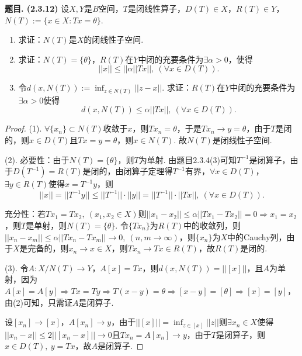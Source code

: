 \documentclass[12pt, a4paper, oneside]{ctexart}
\newcounter{problem}  %
\newenvironment{problem}[1][]{\stepcounter{problem}\par\noindent\textbf{题目\arabic{problem}. #1}}{\smallskip\par}
\let\leq=\leqslant %
\begin{document}
\begin{problem}[(2.3.12)]
    设$X,Y$是$B$空间，$T$是闭线性算子，$D(T)\in X$，$R(T)\in Y$，$N(T):=\{x\in X:Tx=\theta\}$.
    \begin{enumerate}[label=(\arabic*)]
        \item 求证：$N(T)$是$X$的闭线性子空间.
        \item 求证：$N(T)=\{\theta\}$，$R(T)$在$Y$中闭的充要条件为$\exists \alpha >0$，使得
        \begin{equation*}
            ||x||\leq ||\alpha||Tx||,\ (\forall x\in D(T)).
        \end{equation*}
        \item 令$d(x,N(T)):=\inf_{z\in N(T)}||z-x||$. 求证：$R(T)$在$Y$中闭的充要条件为$\exists \alpha >0$使得
        \begin{equation*}
            d(x,N(T))\leq \alpha||Tx||,\ (\forall x\in D(T)).
        \end{equation*}
    \end{enumerate}
\end{problem}
\begin{proof}
    (1). $\forall \{x_n\}\subset N(T)$收敛于$x$，则$Tx_n=\theta$，于是$Tx_n\to y = \theta$，由于$T$是闭的，则$x\in D(T)$且$Tx=y=\theta$，则$x\in N(T)$. 故$N(T)$是闭线性子空间.

    (2). 必要性：由于$N(T) = \{\theta\}$，则$T$为单射. 由题目2.3.4(3)可知$T^{-1}$是闭算子，由于$D(T^{-1})=R(T)$是闭的，由闭算子定理得$T^{-1}$有界，$\forall x\in D(T)$，$\exists y\in R(T)$使得$x=T^{-1}y$，则
    \begin{equation*}
        ||x|| = ||T^{-1}y||\leq ||T^{-1}||\cdot ||y|| = ||T^{-1}||\cdot ||Tx||,\ (\forall x\in D(T)).
    \end{equation*}
    
    充分性：若$Tx_1=Tx_2,\ (x_1,x_2\in X)$则$||x_1-x_2||\leq \alpha||Tx_1-Tx_2|| = 0\Rightarrow x_1=x_2$，则$T$是单射，则$N(T) = \{\theta\}$. 令$\{Tx_n\}$为$R(T)$中的收敛列，则$||x_n-x_m||\leq \alpha||Tx_n-Tx_m||\to 0,\ (n,m\to\infty)$，则$\{x_n\}$为$X$中的Cauchy列，由于$X$是完备的，则$x_n\to x\in X$，则$Tx_n\to Tx\in R(T)$，故$R(T)$是闭的.

    (3). 令$A:X/N(T)\to Y$，$A[x] = Tx$，则$d(x,N(T))  =||[x]||$，且$A$为单射，因为$A[x]=A[y]\Rightarrow Tx=Ty\Rightarrow T(x-y)=\theta\Rightarrow [x-y] = [\theta]\Rightarrow[x]=[y]$，由(2)可知，只需证$A$是闭算子.
    
    设$[x_n]\to[x]$，$A[x_n]\to y$，由于$||[x]|| = \inf_{z\in[x]}||z||$则$\exists x_n\in X$使得$||x_n-x||\leq 2||[x_n-x]||\to 0$且$Tx_n = A[x_n]\to y$，由于$T$是闭算子，则$x\in D(T),\ y=Tx$，故$A$是闭算子.
\end{proof}
\end{document}
